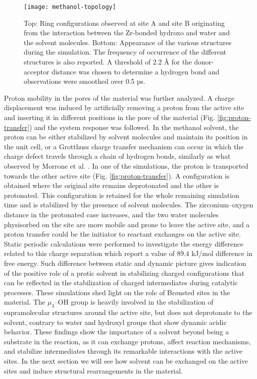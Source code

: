 \begin{figure}[!htbp]
	\centering
	\texttt{[image: methanol-topology]}
	\caption{Top: Ring configurations observed at site A and site B originating from the interaction between the Zr-bonded hydroxo and water and the solvent molecules. Bottom: Appearance of the various structures during the simulation. The frequency of occurrence of the different structures is also reported. A threshold of 2.2 Å for the donor-acceptor distance was chosen to determine a hydrogen bond and observations were smoothed over 0.5 ps.}
	\label{fig:methanol-topology}
\end{figure}
\npar
Proton mobility in the pores of the material was further analyzed. A charge displacement was induced by artificially removing a proton from the active site and inserting it in different positions in the pore of the material (Fig. \ref{fig:proton-transfer}) and the system response was followed. In the methanol solvent, the proton can be either stabilized by solvent molecules and maintain its position in the unit cell, or a Grotthuss charge transfer mechanism can occur in which the charge defect travels through a chain of hydrogen bonds, similarly as what observed by Morrone et al. \cite{morrone2002ab}. In one of the simulations, the proton is transported towards the other active site (Fig. \ref{fig:proton-transfer}). A configuration is obtained where the original site remains deprotonated and the other is protonated. This configuration is retained for the whole remaining simulation time and is stabilized by the presence of solvent molecules. The zirconium--oxygen distance in the protonated case increases, and the two water molecules physisorbed on the site are more mobile and prone to leave the active site, and a proton transfer could be the initiator to reactant exchanges on the active site. Static periodic calculations were performed to investigate the energy difference related to this charge separation which report a value of 89.4 kJ/mol difference in free energy. Such difference between static and dynamic picture gives indication of the positive role of a protic solvent in stabilizing charged configurations that can be reflected in the stabilization of charged intermediates during catalytic processes. These simulations shed light on the role of Br\o{}nsted sites in the material. The $\mu_3$--OH group is heavily involved in the stabilization of supramolecular structures around the active site, but does not deprotonate to the solvent, contrary to water and hydroxyl groups that show dynamic acidic behavior. These findings show the importance of a solvent beyond being a substrate in the reaction, as it can exchange protons, affect reaction mechanisms, and stabilize intermediates through its remarkable interactions with the active sites. In the next section we will see how solvent can be exchanged on the active sites and induce structural rearrangements in the material.

